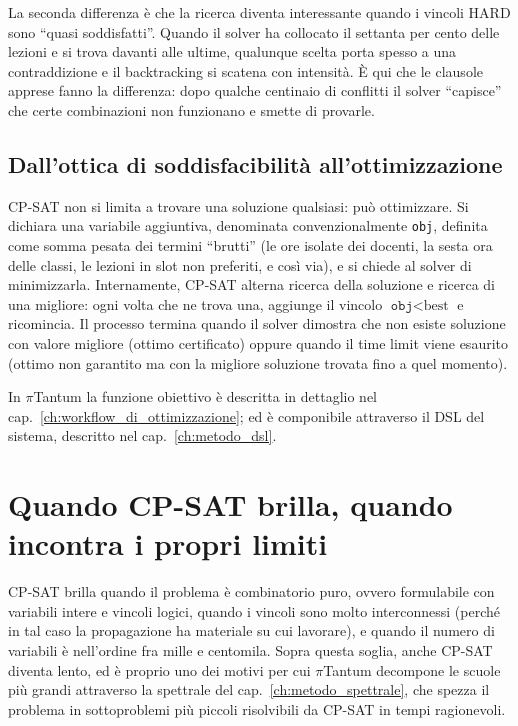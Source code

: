 La seconda differenza \`e che la ricerca diventa interessante
quando i vincoli HARD sono ``quasi soddisfatti''. Quando il
solver ha collocato il settanta per cento delle lezioni e si
trova davanti alle ultime, qualunque scelta porta spesso a
una contraddizione e il backtracking si scatena con
intensit\`a. \`E qui che le clausole apprese fanno la
differenza: dopo qualche centinaio di conflitti il solver
``capisce'' che certe combinazioni non funzionano e smette
di provarle.

\subsection{Dall'ottica di soddisfacibilit\`a all'ottimizzazione}

CP-SAT non si limita a trovare una soluzione qualsiasi: pu\`o
ottimizzare. Si dichiara una variabile aggiuntiva,
denominata convenzionalmente \texttt{obj}, definita come
somma pesata dei termini ``brutti'' (le ore isolate dei
docenti, la sesta ora delle classi, le lezioni in slot non
preferiti, e cos\`i via), e si chiede al solver di
minimizzarla. Internamente, CP-SAT alterna ricerca della
soluzione e ricerca di una migliore: ogni volta che ne trova
una, aggiunge il vincolo $\texttt{obj} < \text{best}$ e
ricomincia. Il processo termina quando il solver dimostra
che non esiste soluzione con valore migliore (ottimo
certificato) oppure quando il time limit viene esaurito
(ottimo non garantito ma con la migliore soluzione trovata
fino a quel momento).

In $\pi$Tantum la funzione obiettivo \`e descritta in
dettaglio nel cap.~\ref{ch:workflow_di_ottimizzazione}; ed \`e
componibile attraverso il DSL del sistema, descritto nel
cap.~\ref{ch:metodo_dsl}.

\section{Quando CP-SAT brilla, quando incontra i propri limiti}

CP-SAT brilla quando il problema \`e combinatorio puro,
ovvero formulabile con variabili intere e vincoli logici,
quando i vincoli sono molto interconnessi (perch\'e in tal
caso la propagazione ha materiale su cui lavorare), e quando
il numero di variabili \`e nell'ordine fra mille e centomila.
Sopra questa soglia, anche CP-SAT diventa lento, ed \`e
proprio uno dei motivi per cui $\pi$Tantum decompone le
scuole pi\`u grandi attraverso la spettrale del
cap.~\ref{ch:metodo_spettrale}, che spezza il problema in
sottoproblemi pi\`u piccoli risolvibili da CP-SAT in tempi
ragionevoli.

